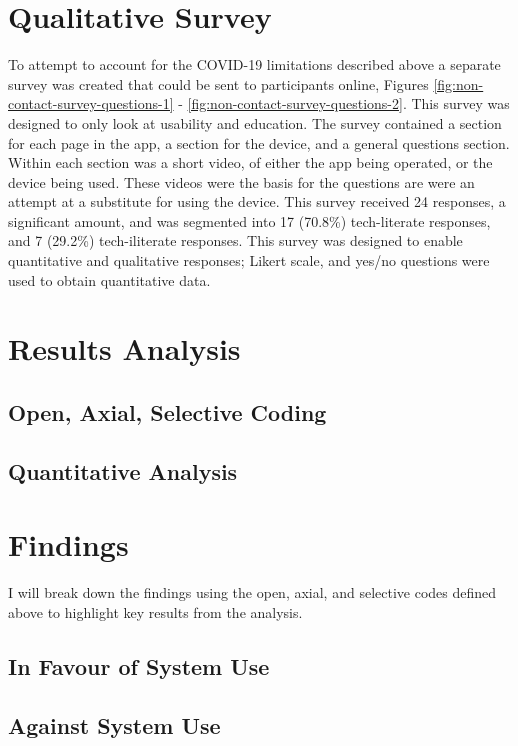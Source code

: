 \documentclass{l4proj}
\begin{document}
\section{Qualitative Survey}

To attempt to account for the COVID-19 limitations described above a separate survey was created that could be sent to participants online, Figures \ref{fig:non-contact-survey-questions-1} - \ref{fig:non-contact-survey-questions-2}. This survey was designed to only look at usability and education. The survey contained a section for each page in the app, a section for the device, and a general questions section. Within each section was a short video, of either the app being operated, or the device being used. These videos were the basis for the questions are were an attempt at a substitute for using the device. This survey received 24 responses, a significant amount, and was segmented into 17 (70.8\%) tech-literate responses, and 7 (29.2\%) tech-iliterate responses. This survey was designed to enable quantitative and qualitative responses; Likert scale, and yes/no questions were used to obtain quantitative data.

\section{Results Analysis}

\subsection{Open, Axial, Selective Coding}

\subsection{Quantitative Analysis}

\section{Findings}

I will break down the findings using the open, axial, and selective codes defined above to highlight key results from the analysis.

\subsection{In Favour of System Use}

\subsection{Against System Use}
\end{document}
